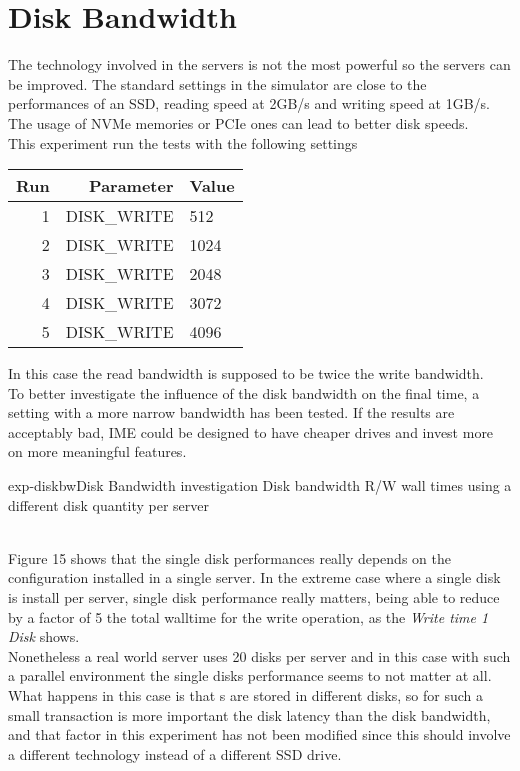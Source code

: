 \section{Disk Bandwidth}\label{diskbw}
The technology involved in the servers is not the most powerful so the servers
can be improved. The standard settings in the simulator are close to the
performances of an SSD, reading speed at 2GB/s and writing speed at 1GB/s. The
usage of NVMe memories or PCIe ones can lead to better disk speeds. \\
This experiment run the tests with the following settings \\
\begin{tabular}{r |r | l}
    \textbf{Run} & \textbf{Parameter} & \textbf{Value} \\\hline
    1 & DISK\_WRITE & 512 \\
    2 & DISK\_WRITE & 1024 \\
    3 & DISK\_WRITE & 2048 \\
    4 & DISK\_WRITE & 3072 \\
    5 & DISK\_WRITE & 4096 \\
\end{tabular}

In this case the read bandwidth is supposed to be twice the write bandwidth. \\
To better investigate the influence of the disk bandwidth on the final time, a
setting with a more narrow bandwidth has been tested. If the results are
acceptably bad, IME could be designed to have cheaper drives and invest more on
more meaningful features.

\begin{myimage}{exp-diskbw}{Disk Bandwidth investigation}
Disk bandwidth R/W wall times using a different disk quantity per server
\end{myimage} \\
Figure 15 shows that the single disk performances really depends on the
configuration installed in a single server. In the extreme case where a single
disk is install per server, single disk performance really matters, being able
to reduce by a factor of 5 the total walltime for the write operation, as the
\emph{Write time 1 Disk} shows. \\
Nonetheless a real world server uses 20 disks per server and in this case with
such a parallel environment the single disks performance seems to not matter at
all. What happens in this case is that \cmloid s are stored in different disks,
so for such a small transaction is more important the disk latency than the disk
bandwidth, and that factor in this experiment has not been modified since this
should involve a different technology instead of a different SSD drive.

